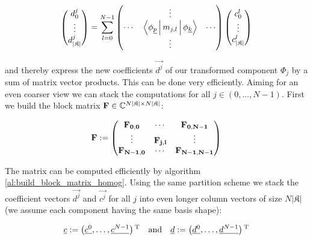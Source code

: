 \begin{equation*}
  \begin{pmatrix}
    d_{0}^j \\
    \vdots \\
    d_{|\mathfrak{K}|}^j \\
  \end{pmatrix}
  = \sum_{l=0}^{N-1}
  \begin{pmatrix}
    {}     & \vdots                                               & {} \\
    \cdots & \Braket{ \phi_{\vec{p}} | m_{j,l} | \phi_{\vec{k}} } & \cdots \\
    {}     & \vdots                                               & {}
  \end{pmatrix}
  \begin{pmatrix}
    c_{0}^l \\
    \vdots \\
    c_{|\mathfrak{K}|}^l \\
  \end{pmatrix}
\end{equation*}

and thereby express the new coefficients $\vec{d^j}$ of our transformed component
$\Phi_j$ by a sum of matrix vector products. This can be done very efficiently.
Aiming for an even coarser view we can stack the computations for all $j \in (0,\ldots, N-1)$.
First we build the block matrix $\mat{F} \in \mathbb{C}^{N|\mathfrak{K}| \times N|\mathfrak{K}|}$:

\begin{equation*}
  \mat{F} \assign
  \begin{pmatrix}
    \mat{F_{0,0}}   & \cdots        & \mat{F_{0, N-1}} \\
    \vdots          & \mat{F_{j,l}} & \vdots \\
    \mat{F_{N-1,0}} & \cdots        & \mat{F_{N-1, N-1}} \\
  \end{pmatrix}
\end{equation*}

The matrix can be computed efficiently by algorithm \ref{al:build_block_matrix_homog}.
Using the same partition scheme we stack the coefficient vectors $\vec{d^j}$ and
$\vec{c^j}$ for all $j$ into even longer column vectors of size $N |\mathfrak{K}|$
(we assume each component having the same basis shape):

\begin{align*}
  \vec{c} \assign \left( \vec{c^0} , \ldots , \vec{c^{N-1}} \right)\T
  \quad \text{and} \quad
  \vec{d} \assign \left( \vec{d^0} , \ldots , \vec{d^{N-1}} \right)\T
\end{align*}

